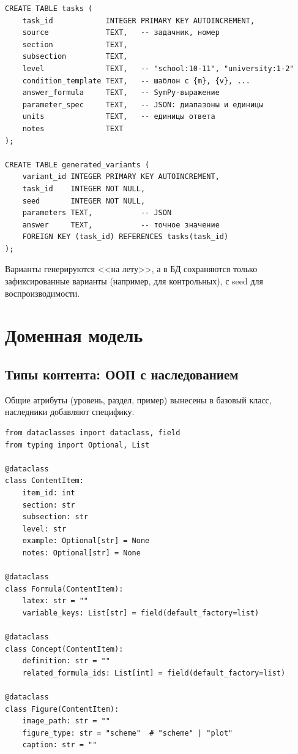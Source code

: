 \documentclass[12pt,a4paper]{article}
\begin{document}
\begin{verbatim}
CREATE TABLE tasks (
    task_id            INTEGER PRIMARY KEY AUTOINCREMENT,
    source             TEXT,   -- задачник, номер
    section            TEXT,
    subsection         TEXT,
    level              TEXT,   -- "school:10-11", "university:1-2"
    condition_template TEXT,   -- шаблон с {m}, {v}, ...
    answer_formula     TEXT,   -- SymPy-выражение
    parameter_spec     TEXT,   -- JSON: диапазоны и единицы
    units              TEXT,   -- единицы ответа
    notes              TEXT
);

CREATE TABLE generated_variants (
    variant_id INTEGER PRIMARY KEY AUTOINCREMENT,
    task_id    INTEGER NOT NULL,
    seed       INTEGER NOT NULL,
    parameters TEXT,           -- JSON
    answer     TEXT,           -- точное значение
    FOREIGN KEY (task_id) REFERENCES tasks(task_id)
);
\end{verbatim}

\noindent
Варианты генерируются <<на лету>>, а в БД сохраняются только
зафиксированные варианты (например, для контрольных), с seed
для воспроизводимости.

\section{Доменная модель}

\subsection{Типы контента: ООП с наследованием}

Общие атрибуты (уровень, раздел, пример) вынесены в базовый класс,
наследники добавляют специфику.

\begin{verbatim}
from dataclasses import dataclass, field
from typing import Optional, List

@dataclass
class ContentItem:
    item_id: int
    section: str
    subsection: str
    level: str
    example: Optional[str] = None
    notes: Optional[str] = None

@dataclass
class Formula(ContentItem):
    latex: str = ""
    variable_keys: List[str] = field(default_factory=list)

@dataclass
class Concept(ContentItem):
    definition: str = ""
    related_formula_ids: List[int] = field(default_factory=list)

@dataclass
class Figure(ContentItem):
    image_path: str = ""
    figure_type: str = "scheme"  # "scheme" | "plot"
    caption: str = ""
\end{verbatim}
\end{document}
